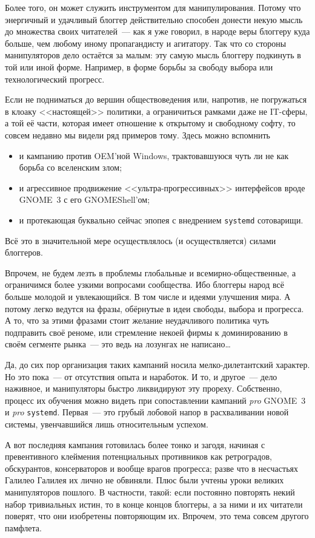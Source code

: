 Более того, он может служить инструментом для манипулирования. Потому что энергичный и удачливый блоггер действительно способен донести некую мысль до множества своих читателей~--- как я уже говорил, в народе веры блоггеру куда больше, чем любому иному пропагандисту и агитатору. Так что со стороны манипуляторов дело остаётся за малым: эту самую мысль блоггеру подкинуть в той или иной форме. Например, в форме борьбы за свободу выбора или технологический прогресс.

Если не подниматься до вершин обществоведения или, напротив, не погружаться в клоаку <<настоящей>> политики, а ограничиться рамками даже не IT-сферы, а той её части, которая имеет отношение к открытому и свободному софту, то совсем недавно мы видели ряд примеров тому. Здесь можно вспомнить

\begin{itemize}
	\item и кампанию против OEM'ной Windows, трактовавшуюся чуть ли не как борьба со вселенским злом; 
	\item и агрессивное продвижение <<ультра-прогрессивных>> интерфейсов вроде GNOME~3 с его GNOMEShell'ом; 
	\item и протекающая буквально сейчас эпопея с внедрением \texttt{systemd} сотоварищи. 
\end{itemize}


Всё это в значительной мере осуществлялось (и осуществляется) силами блоггеров.

Впрочем, не будем лезть в проблемы глобальные и всемирно-общественные, а ограничимся более узкими вопросами сообщества. Ибо блоггеры народ всё больше молодой и увлекающийся. В том числе и идеями улучшения мира. А потому легко ведутся на фразы, обёрнутые в идеи свободы, выбора и прогресса. А то, что за этими фразами стоит желание неудачливого политика чуть подправить своё реноме, или стремление некоей фирмы к доминированию в своём сегменте рынка~--- это ведь на лозунгах не написано\dots

Да, до сих пор организация таких кампаний носила мелко-дилетантский характер. Но это пока~--- от отсутствия опыта и наработок. И то, и другое~--- дело наживное, и манипуляторы быстро ликвидируют эту прореху. Собственно, процесс их обучения можно видеть при сопоставлении кампаний \textit{pro} GNOME~3 и 
\textit{pro} \texttt{systemd}. Первая~--- это грубый лобовой напор в расхваливании новой системы, увенчавшийся лишь относительным успехом.

А вот последняя кампания готовилась более тонко и загодя, начиная с превентивного клеймения потенциальных противников как ретроградов, обскурантов, консерваторов и вообще врагов прогресса; разве что в несчастьях Галилео Галилея их лично не обвиняли. Плюс были учтены уроки великих манипуляторов пошлого. В частности, такой: если постоянно повторять некий набор тривиальных истин, то в конце концов блоггеры, а за ними и их читатели поверят, что они изобретены повторяющим их. Впрочем, это тема совсем другого памфлета.

